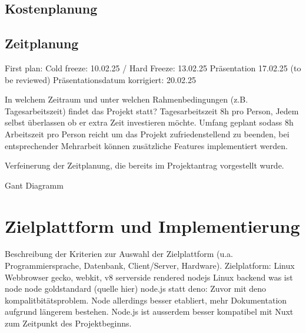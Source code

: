 \documentclass[a4paper,12pt]{article}
\begin{document}
\subsection{Kostenplanung}

\subsection{Zeitplanung}
First plan: Cold freeze: 10.02.25 / Hard Freeze: 13.02.25 
Präsentation 17.02.25 (to be reviewed) 
Präsentationsdatum korrigiert: 20.02.25 

In welchem Zeitraum und unter welchen
Rahmenbedingungen (z.B. Tagesarbeitszeit) findet das Projekt statt? Tagesarbeitszeit 8h pro Person, Jedem selbst überlassen ob er extra Zeit investieren möchte. Umfang geplant sodass 8h Arbeitszeit pro Person reicht um das Projekt zufriedenstellend zu beenden, bei entsprechender Mehrarbeit können zusätzliche Features implementiert werden. 

Verfeinerung der Zeitplanung, die bereits im Projektantrag vorgestellt wurde.

Gant Diagramm

\newpage \section{Zielplattform und Implementierung}
Beschreibung der Kriterien
zur Auswahl der Zielplattform (u.a. Programmiersprache, Datenbank,
Client/Server, Hardware).
Zielplatform: Linux 
Webbrowser 
gecko, webkit, v8 serverside rendered 
nodejs Linux backend
was ist node node goldstandard (quelle hier) 
node.js statt deno: Zuvor mit deno kompalitbitätsproblem. Node allerdings besser etabliert, mehr Dokumentation aufgrund längerem bestehen. Node.js ist ausserdem besser kompatibel mit Nuxt zum Zeitpunkt des Projektbeginns. 
\end{document}
